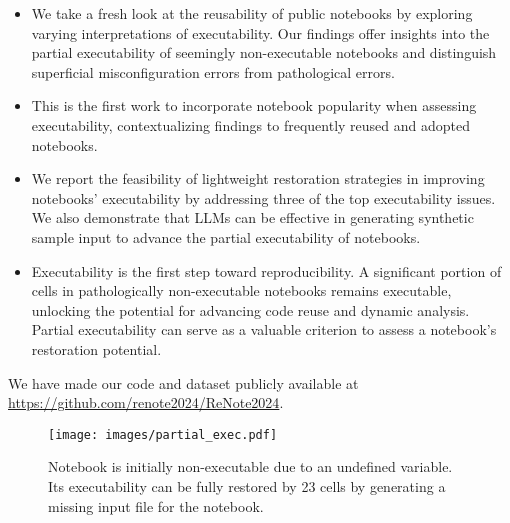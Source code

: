 \begin{itemize}
    \item We take a fresh look at the reusability of public notebooks by exploring varying interpretations of executability. Our findings offer insights into the partial executability of seemingly non-executable notebooks and distinguish superficial misconfiguration errors from pathological errors. 
    \item This is the first work to incorporate notebook popularity when assessing executability, contextualizing findings to frequently reused and adopted notebooks. 
    \item We report the feasibility of lightweight restoration strategies in improving notebooks' executability by addressing three of the top executability issues. We also demonstrate that LLMs can be effective in generating synthetic sample input to advance the partial executability of notebooks. 
    \item Executability is the first step toward reproducibility. A significant portion of cells in pathologically non-executable notebooks remains executable, unlocking the potential for advancing code reuse and dynamic analysis. Partial executability can serve as a valuable criterion to assess a notebook’s restoration potential. 
\end{itemize}

\noindent We have made our code and dataset publicly available at \url{https://github.com/renote2024/ReNote2024}.

\begin{figure}[t!] %
    \centerline{\texttt{[image: images/partial\_exec.pdf]}}
    \caption{Notebook \cite{girlscript2024} is initially non-executable due to an undefined variable. Its executability can be fully restored by 23 cells by generating a missing input file for the notebook.}
    \label{fig:cs1-full-exec}
\end{figure}












